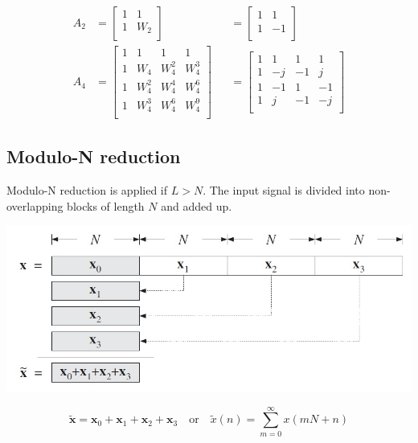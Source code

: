 \begin{align*}
	A_2 &= 
		\begin{bmatrix}
			1& 1 \\
			1& W_2 \\
		\end{bmatrix}
		&&= 
		\begin{bmatrix}
			1& 1 \\
			1& -1 \\
		\end{bmatrix}	 \\
	A_4 &= 
		\begin{bmatrix}
			1& 1& 1& 1 \\
			1& W_4& W_4^2& W_4^3 \\
			1& W_4^2& W_4^4& W_4^6 \\
			1& W_4^3& W_4^6& W_4^9 \\
		\end{bmatrix}
		&&=
		\begin{bmatrix}
			1& 1& 1& 1 \\
			1& -j& -1& j \\
			1& -1& 1& -1 \\
			1& j& -1& -j \\
		\end{bmatrix}
\end{align*}

\subsection{Modulo-N reduction}
Modulo-N reduction is applied if $L>N$.  The input signal is divided into
non-overlapping blocks of length $N$ and added up.

\begin{center}
	\includegraphics[width=0.8\linewidth]{images/DFT_FFT_ModuloN.jpg}
\end{center}

\begin{equation*}
	\tilde{\mathbf{x}} = \mathbf{x}_0 + \mathbf{x}_1 + \mathbf{x}_2 + \mathbf{x}_3
		\quad \text{or} \quad
	\tilde{x}(n) = \sum\limits_{m=0}^{\infty} x(mN + n)
\end{equation*}

